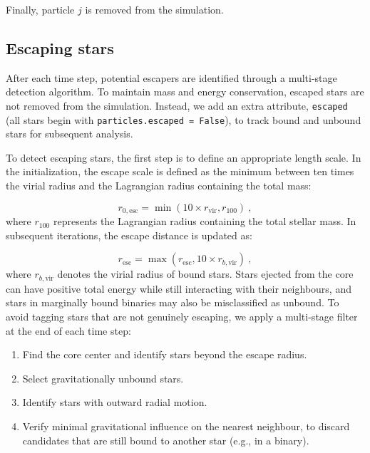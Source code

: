 Finally, particle $j$ is removed from the simulation.

\subsection{Escaping stars}
\label{subsec:3.2.4_Escapers}

After each time step, potential escapers are identified through a multi-stage detection algorithm. To maintain mass and energy conservation, escaped stars are not removed from the simulation. Instead, we add an extra attribute, \texttt{escaped} (all stars begin with \texttt{particles.escaped = False}), to track bound and unbound stars for subsequent analysis. 

To detect escaping stars, the first step is to define an appropriate length scale. In the initialization, the escape scale is defined as the minimum between ten times the virial radius and the Lagrangian radius containing the total mass: 

\begin{equation}
	r_{0, \text{esc}} = \min (10 \times r_{\text{vir}}, r_{100}) ~,
\end{equation}
where $r_{100}$ represents the Lagrangian radius containing the total stellar mass. In subsequent iterations, the escape distance is updated as:

\begin{equation}
	r_{\text{esc}} = \max (r_{\text{esc}}, 10 \times r_{b, \text{vir}})~,
\end{equation}
where $r_{b, \text{vir}}$ denotes the virial radius of bound stars. Stars ejected from the core can have positive total energy while still interacting with their neighbours, and stars in marginally bound binaries may also be misclassified as unbound. To avoid tagging stars that are not genuinely escaping, we apply a multi-stage filter at the end of each time step:

\begin{enumerate}
	\item Find the core center and identify stars beyond the escape radius.
	\item Select gravitationally unbound stars.
	\item Identify stars with outward radial motion.
	\item Verify minimal gravitational influence on the nearest neighbour, to discard candidates that are still bound to another star (e.g., in a binary).
\end{enumerate}

